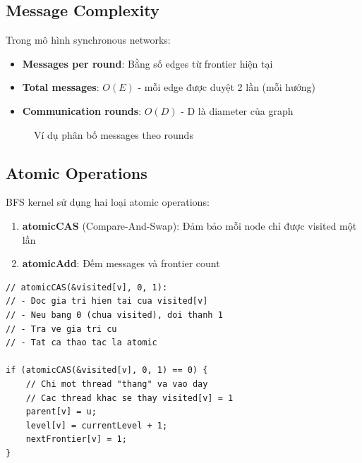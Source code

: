 \subsection{Message Complexity}

Trong mô hình synchronous networks:

\begin{itemize}
    \item \textbf{Messages per round}: Bằng số edges từ frontier hiện tại
    \item \textbf{Total messages}: $O(E)$ - mỗi edge được duyệt 2 lần (mỗi hướng)
    \item \textbf{Communication rounds}: $O(D)$ - D là diameter của graph
\end{itemize}

\begin{figure}[H]
\centering
{}
\caption{Ví dụ phân bố messages theo rounds}
\label{fig:message_pattern}
\end{figure}

\subsection{Atomic Operations}

BFS kernel sử dụng hai loại atomic operations:

\begin{enumerate}
    \item \textbf{atomicCAS} (Compare-And-Swap): Đảm bảo mỗi node chỉ được visited một lần
    \item \textbf{atomicAdd}: Đếm messages và frontier count
\end{enumerate}

\begin{lstlisting}[caption={Chi tiết Atomic CAS cho BFS}, label={lst:atomic_cas}]
// atomicCAS(&visited[v], 0, 1):
// - Doc gia tri hien tai cua visited[v]
// - Neu bang 0 (chua visited), doi thanh 1
// - Tra ve gia tri cu
// - Tat ca thao tac la atomic

if (atomicCAS(&visited[v], 0, 1) == 0) {
    // Chi mot thread "thang" va vao day
    // Cac thread khac se thay visited[v] = 1
    parent[v] = u;
    level[v] = currentLevel + 1;
    nextFrontier[v] = 1;
}
\end{lstlisting}

